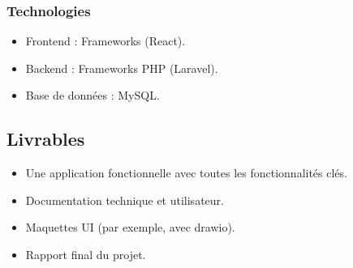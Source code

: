 \subsubsection{Technologies}
\begin{itemize}
    \item Frontend : Frameworks (React).
    \item Backend : Frameworks PHP (Laravel).
    \item Base de données : MySQL.
\end{itemize}

\subsection{Livrables}
\begin{itemize}
    \item Une application fonctionnelle avec toutes les fonctionnalités clés.
    \item Documentation technique et utilisateur.
    \item Maquettes UI (par exemple, avec drawio).
    \item Rapport final du projet.
\end{itemize}
